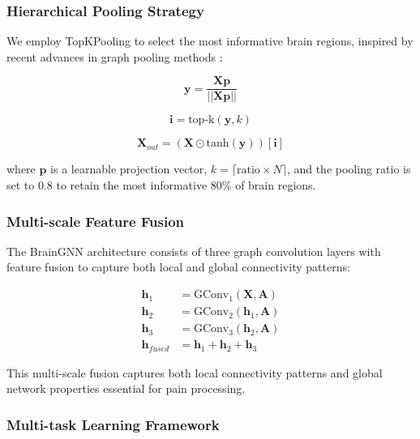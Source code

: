 \documentclass[10pt,journal,compsoc]{IEEEtran}
\begin{document}
\subsubsection{Hierarchical Pooling Strategy}

We employ TopKPooling to select the most informative brain regions, inspired by recent advances in graph pooling methods \cite{gao2019graph}:

\begin{equation}
\mathbf{y} = \frac{\mathbf{X}\mathbf{p}}{||\mathbf{X}\mathbf{p}||}
\end{equation}

\begin{equation}
\mathbf{i} = \text{top-k}(\mathbf{y}, k)
\end{equation}

\begin{equation}
\mathbf{X}_{out} = (\mathbf{X} \odot \text{tanh}(\mathbf{y}))[\mathbf{i}]
\end{equation}

where $\mathbf{p}$ is a learnable projection vector, $k = \lceil \text{ratio} \times N \rceil$, and the pooling ratio is set to 0.8 to retain the most informative 80\% of brain regions.

\subsubsection{Multi-scale Feature Fusion}

The BrainGNN architecture consists of three graph convolution layers with feature fusion to capture both local and global connectivity patterns:

\begin{align}
\mathbf{h}_1 &= \text{GConv}_1(\mathbf{X}, \mathbf{A}) \\
\mathbf{h}_2 &= \text{GConv}_2(\mathbf{h}_1, \mathbf{A}) \\
\mathbf{h}_3 &= \text{GConv}_3(\mathbf{h}_2, \mathbf{A}) \\
\mathbf{h}_{fused} &= \mathbf{h}_1 + \mathbf{h}_2 + \mathbf{h}_3
\end{align}

This multi-scale fusion captures both local connectivity patterns and global network properties essential for pain processing.

\subsubsection{Multi-task Learning Framework}
\end{document}
